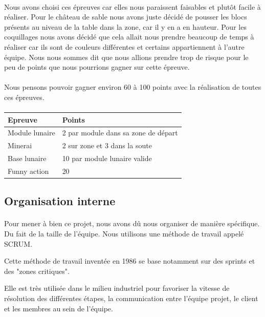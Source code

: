 \documentclass[12pt,a4paper]{article}
\begin{document}
\paragraph{}
Nous avons choisi ces épreuves car elles nous paraissent faisables et plutôt facile à réaliser. Pour 
le château de sable nous avons juste décidé de pousser les blocs présents au niveau de la table dans la zone, 
car il y en a en hauteur. Pour les coquillages nous avons décidé que cela allait nous prendre beaucoup de temps à 
réaliser car ils sont de couleurs différentes et certains appartiennent à l'autre équipe. Nous nous sommes dit que 
nous allions prendre trop de risque pour le peu de points que nous pourrions gagner sur cette épreuve. 

\paragraph{}
Nous pensons pouvoir gagner environ 60 à 100 points avec la réalisation de toutes ces épreuves.

\paragraph{}
\begin{tabular}{|l|l|}
  \hline
  Epreuve & Points\\
  \hline
  Module lunaire & 2 par module dans sa zone de départ \\
  Minerai & 2 sur zone et 3 dans la soute \\
	Base lunaire & 10 par module lunaire valide \\
	Funny action & 20 \\
  \hline
\end{tabular}


\subsection{Organisation interne}
\paragraph{}
Pour mener à bien ce projet, nous avons dû nous organiser de manière spécifique. Du fait de la taille de l'équipe. Nous 
utilisons une méthode de travail appelé SCRUM.

Cette méthode de travail inventée en 1986 se base notamment sur des sprints et des "zones critiques".

Elle est très utilisée dans le milieu industriel pour favoriser la vitesse de résolution des différentes étapes, la communication entre l'équipe projet, le client 
et les membres au sein de l'équipe.
\end{document}
